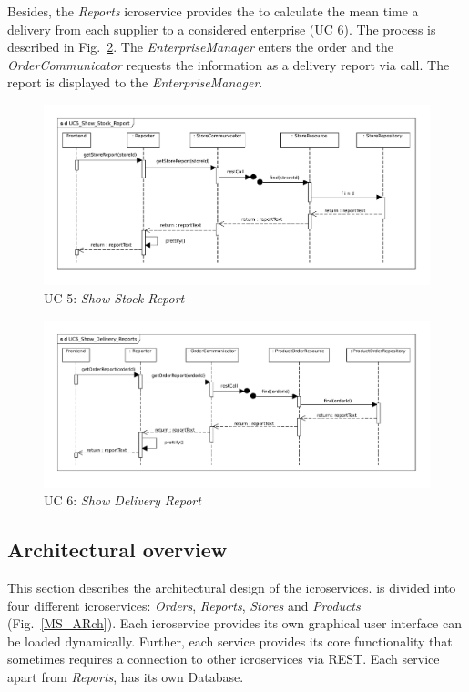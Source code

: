 		Besides, the \textit{Reports} icroservice provides the  to calculate the mean time a delivery  from each supplier to a considered enterprise (UC 6). 
		The process is described in Fig.~\ref{MS_UC6}. 
		The \textit{EnterpriseManager} enters the order  and the \textit{OrderCommunicator} requests the information as a delivery report via  call. 
		The report is displayed to the \textit{EnterpriseManager}.
		
	
			
			\begin{figure}[!h]
				\centering
				\includegraphics[width = 1\textwidth]{img/UC5_Show_Stock_Report.pdf}
				\caption{UC 5: \textit{Show Stock Report}}
				\label{MS_UC5}
			\end{figure}
			
			\begin{figure}[!h]
				\centering
				\includegraphics[width = 1\textwidth]{img/UC6_Show_Delivery_Reports.pdf}
				\caption{UC 6: \textit{Show Delivery Report}}
				\label{MS_UC6}
			\end{figure}
			
	\FloatBarrier
	\subsection{Architectural overview}	\label{archiOverviewMicro}	
	This section describes the architectural design of the icroservices. 
	\CoCoME is divided into four different icroservices: \textit{Orders}, \textit{Reports}, \textit{Stores} and \textit{Products} (Fig.~\ref{MS_ARch}). 
	Each icroservice provides its own graphical user interface
	 can be loaded dynamically. 
	Further, each service provides its core functionality that sometimes requires a connection to other icroservices via REST. 
	Each service apart from \textit{Reports}, has its own Database.

